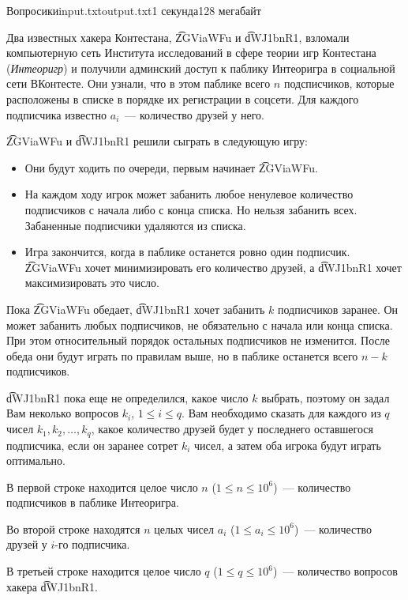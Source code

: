 \begin{problem}{Вопросики}{input.txt}{output.txt}{1 секунда}{128 мегабайт}

Два известных хакера Контестана, \t{ZGViaWFu} и \t{dWJ1bnR1}, взломали компьютерную сеть Института исследований в сфере теории игр Контестана (\textit{Интеоригр}) и получили админский доступ к паблику Интеоригра в социальной сети ВКонтесте. Они узнали, что в этом паблике всего $n$ подсписчиков, которые расположены в списке в порядке их регистрации в соцсети. Для каждого подписчика известно $a_i$~--- количество друзей у него.

\t{ZGViaWFu} и \t{dWJ1bnR1} решили сыграть в следующую игру:

\begin{itemize}
   \item Они будут ходить по очереди, первым начинает \t{ZGViaWFu}.
   \item На каждом ходу игрок может забанить любое ненулевое количество подписчиков с начала либо с конца списка. Но нельзя забанить всех. Забаненные подписчики удаляются из списка.
   \item Игра закончится, когда в паблике останется ровно один подписчик. \t{ZGViaWFu} хочет минимизировать его количество друзей, а \t{dWJ1bnR1} хочет максимизировать это число.   
\end{itemize}

Пока \t{ZGViaWFu} обедает, \t{dWJ1bnR1} хочет забанить $k$ подписчиков заранее. Он может забанить любых подписчиков, не обязательно с начала или конца списка. При этом относительный порядок остальных подписчиков не изменится. После обеда они будут играть по правилам выше, но в паблике останется всего $n-k$ подписчиков.

\t{dWJ1bnR1} пока еще не определился, какое число $k$ выбрать, поэтому он задал Вам неколько вопросов $k_i$, $1 \le i \le q$. Вам необходимо сказать для каждого из $q$ чисел $k_1, k_2, \dots, k_q$, какое количество друзей будет у последнего оставшегося подписчика, если он заранее сотрет $k_i$ чисел, а затем оба игрока будут играть оптимально.

\InputFile
В первой строке находится целое число $n$ ($1 \le n \le 10^6$)~--- количество подписчиков в паблике Интеоригра.

Во второй строке находятся $n$ целых чисел $a_i$ ($1 \le a_i \le 10^6$)~--- количество друзей у $i$-го подписчика.

В третьей строке находится целое число $q$ ($1 \le q \le 10^6$)~--- количество вопросов хакера \t{dWJ1bnR1}.


\end{problem}
